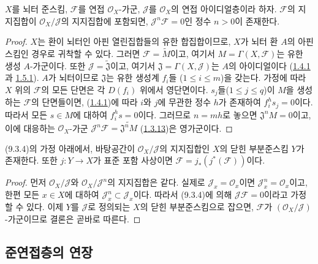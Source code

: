 \begin{proposition}[9.3.4]
\label{I.9.3.4-ko}
$X$를 뇌터 준스킴, $\mathscr{F}$를 연접 $\mathscr{O}_X$-가군,
$\mathscr{J}$를 $\mathscr{O}_X$의 연접 아이디얼층이라 하자.
$\mathscr{F}$의 지지집합이 $\mathscr{O}_X/\mathscr{J}$의 지지집합에
포함되면, $\mathscr{J}^n\mathscr{F}=0$인 정수 $n>0$이 존재한다.
\end{proposition}

\begin{proof}
$X$는 환이 뇌터인 아핀 열린집합들의 유한 합집합이므로, $X$가 뇌터
환 $A$의 아핀 스킴인 경우로 귀착할 수 있다. 그러면
$\mathscr{F}=\widetilde M$이고, 여기서
$M=\Gamma(X,\mathscr{F})$는 유한 생성 $A$-가군이다. 또한
$\mathscr{J}=\widetilde{\mathfrak{J}}$이고, 여기서
$\mathfrak{J}=\Gamma(X,\mathscr{J})$는 $A$의 아이디얼이다
(\hyperref[I.1.4.1-ko]{1.4.1}과 \hyperref[I.1.5.1-ko]{1.5.1}).
$A$가 뇌터이므로 $\mathfrak{J}$는 유한 생성계 $f_i$들
($1\leq i\leq m$)을 갖는다. 가정에 따라 $X$ 위의 $\mathscr{F}$의 모든
단면은 각 $D(f_i)$ 위에서 영단면이다. $s_j$들($1\leq j\leq q$)이
$M$을 생성하는 $\mathscr{F}$의 단면들이면,
(\hyperref[I.1.4.1-ko]{1.4.1})에 따라 $i$와 $j$에 무관한 정수 $h$가
존재하여 $f_i^h s_j=0$이다. 따라서 모든 $s\in M$에 대하여
$f_i^h s=0$이다. 그러므로 $n=mh$로 놓으면
$\mathfrak{J}^nM=0$이고, 이에 대응하는 $\mathscr{O}_X$-가군
$\mathscr{J}^n\mathscr{F}=\widetilde{\mathfrak{J}^nM}$
(\hyperref[I.1.3.13-ko]{1.3.13})은 영가군이다.
\end{proof}

\begin{corollary}[9.3.5]
\label{I.9.3.5-ko}
(9.3.4)의 가정 아래에서, 바탕공간이
$\mathscr{O}_X/\mathscr{J}$의 지지집합인 $X$의 닫힌 부분준스킴 $Y$가
존재한다. 또한 $j:Y\to X$가 표준 포함 사상이면
$\mathscr{F}=j_*(j^*(\mathscr{F}))$이다.
\end{corollary}

\begin{proof}
먼저 $\mathscr{O}_X/\mathscr{J}$와
$\mathscr{O}_X/\mathscr{J}^n$의 지지집합은 같다. 실제로
$\mathscr{J}_x=\mathscr{O}_x$이면
$\mathscr{J}_x^n=\mathscr{O}_x$이고, 한편 모든 $x\in X$에 대하여
$\mathscr{J}_x^n\subset\mathscr{J}_x$이다. 따라서 (9.3.4)에 의해
$\mathscr{J}\mathscr{F}=0$이라고 가정할 수 있다. 이제 $Y$를
$\mathscr{J}$로 정의되는 $X$의 닫힌 부분준스킴으로 잡으면,
$\mathscr{F}$가 $(\mathscr{O}_X/\mathscr{J})$-가군이므로 결론은
곧바로 따른다.
\end{proof}


\subsection{준연접층의 연장}
\label{subsection:I.9.4-ko}

